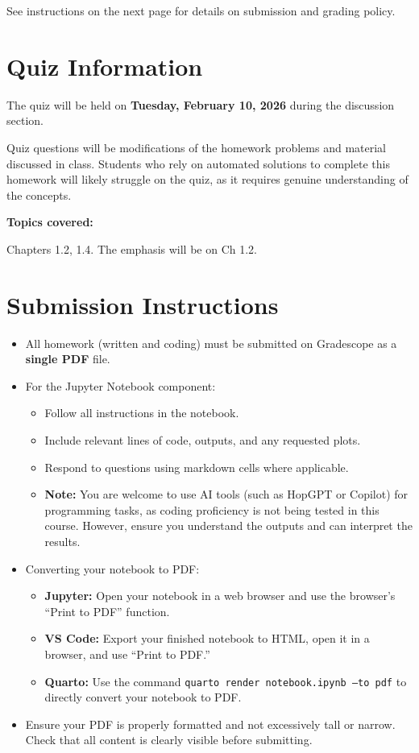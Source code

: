 \documentclass[reqno, answers]{exam}
\begin{document}
See instructions on the next page for details on submission and grading policy.


\section*{Quiz Information}

The quiz will be held on {\bf Tuesday, February 10, 2026} during the discussion section.

Quiz questions will be modifications of the homework problems and material discussed in class. Students who rely on automated solutions to complete this homework will likely struggle on the quiz, as it requires genuine understanding of the concepts.

\textbf{Topics covered:} 

Chapters 1.2, 1.4. The emphasis will be on Ch 1.2.


\section*{Submission Instructions}

\begin{itemize}
  \item All homework (written and coding) must be submitted on Gradescope as a \textbf{single PDF} file.

  \item For the Jupyter Notebook component:
        \begin{itemize}
          \item Follow all instructions in the notebook.
          \item Include relevant lines of code, outputs, and any requested plots.
          \item Respond to questions using markdown cells where applicable.
          \item \textbf{Note:} You are welcome to use AI tools (such as HopGPT or Copilot) for programming tasks, as coding proficiency is not being tested in this course. However, ensure you understand the outputs and can interpret the results.
        \end{itemize}

  \item Converting your notebook to PDF:
        \begin{itemize}
          \item \textbf{Jupyter:} Open your notebook in a web browser and use the browser's ``Print to PDF'' function.

          \item \textbf{VS Code:} Export your finished notebook to HTML, open it in a browser, and use ``Print to PDF.''

          \item \textbf{Quarto:} Use the command \texttt{quarto render notebook.ipynb --to pdf} to directly convert your notebook to PDF.
        \end{itemize}

  \item Ensure your PDF is properly formatted and not excessively tall or narrow. Check that all content is clearly visible before submitting.
\end{itemize}
\end{document}

